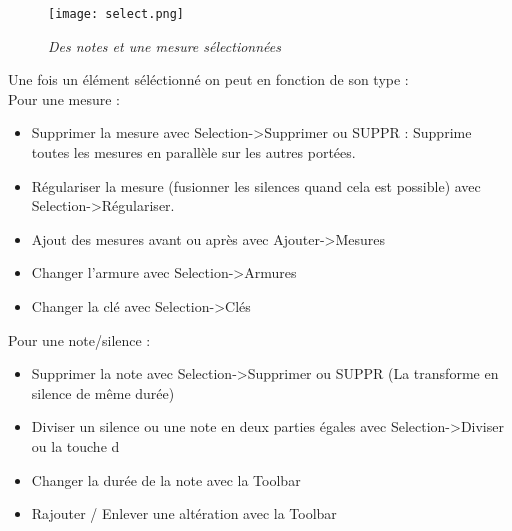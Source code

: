 \documentclass[12pt]{report}
\begin{document}
\newpage
\begin{figure}[H]
  \centering
  \texttt{[image: select.png]}\\
    \caption{\textit{Des notes et une mesure sélectionnées}}
\end{figure}
\vskip 0.3in

Une fois un élément séléctionné on peut en fonction de son type : \\

Pour une mesure : \\
\begin{itemize}
 \item Supprimer la mesure avec Selection->Supprimer ou SUPPR : Supprime toutes les mesures en parallèle sur les autres portées.\\
 \item Régulariser la mesure (fusionner les silences quand cela est possible) avec Selection->Régulariser.\\
 \item Ajout des mesures avant ou après avec Ajouter->Mesures\\
 \item Changer l'armure avec Selection->Armures\\
 \item Changer la clé avec Selection->Clés\\
\end{itemize}
\vskip 0.2in
Pour une note/silence : \\
\begin{itemize}
 \item Supprimer la note avec Selection->Supprimer ou SUPPR (La transforme en silence de même durée)\\
 \item Diviser un silence ou une note en deux parties égales avec Selection->Diviser ou la touche d\\
 \item Changer la durée de la note avec la Toolbar\\
 \item Rajouter / Enlever une altération avec la Toolbar \\
\end{itemize}
\end{document}
